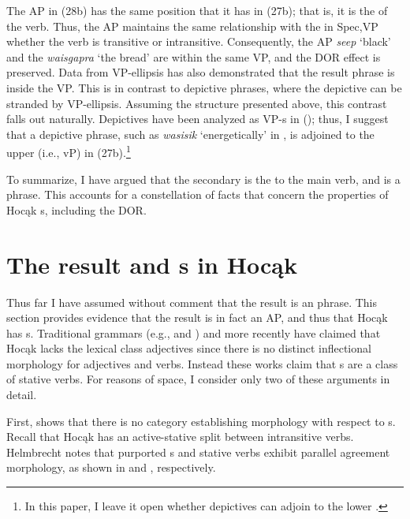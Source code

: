\documentclass[output=paper]{LSP/langsci}
\begin{document}
The AP in (28b) has the same position that it has in (27b); that is, it is the  of the verb. Thus, the AP maintains the same relationship with the  in Spec,VP whether the verb is transitive or intransitive. Consequently, the AP \textit{seep} `black' and the  \textit{waisgapra} `the bread' are within the same VP, and the DOR effect is preserved. Data from VP-ellipsis has also demonstrated that the result phrase is inside the VP. This is in contrast to depictive phrases, where the depictive can be stranded by VP-ellipsis. Assuming the structure presented above, this contrast falls out naturally. Depictives have been analyzed as VP-s in  (\citealt{LevinRappaportHovav1995}); thus, I suggest that a depictive phrase, such as \textit{wasisik} `energetically' in , is adjoined to the upper  (i.e., vP) in (27b).\footnote{In this paper, I leave it open whether depictives can adjoin to the lower .}

To summarize, I have argued that the  secondary  is the  to the main verb, and is a phrase. This accounts for a constellation of facts that concern the properties of Hocąk s, including the DOR.

\section{The result  and s in Hocąk} \label{sec:rosen:5}

Thus far I have assumed without comment that the result  is an  phrase. This section provides evidence that the result is in fact an AP, and thus that Hocąk has s. Traditional grammars (e.g., \citealt{Lipkind1945} and \citealt{Susman1943}) and more recently \citet{Helmbrecht2006b} have claimed that Hocąk lacks the lexical class adjectives since there is no distinct inflectional morphology for adjectives and verbs. Instead these works claim that s are a class of stative verbs. For reasons of space, I consider only two of these arguments in detail.

First, \citet{Helmbrecht2006b} shows that there is no category establishing morphology with respect to s. Recall that Hocąk has an active-stative split between intransitive verbs. Helmbrecht notes that purported s and stative verbs exhibit parallel agreement morphology, as shown in  and , respectively.
\end{document}
